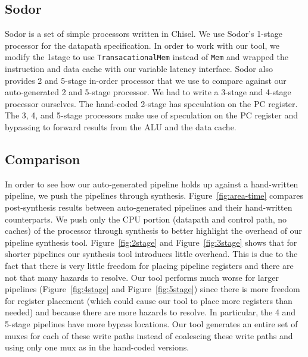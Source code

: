 \subsection{Sodor}
Sodor is a set of simple processors written in Chisel. We use Sodor's
1-stage processor for the datapath specification. In order to work
with our tool, we modify the 1stage to use {\tt TransacationalMem}
instead of {\tt Mem} and wrapped the instruction and data cache with
our variable latency interface. Sodor also provides 2 and 5-stage
in-order processor that we use to compare against our auto-generated 2
and 5-stage processor. We had to write a 3-stage and 4-stage processor
ourselves. The hand-coded 2-stage has speculation on the PC
register. The 3, 4, and 5-stage processors make use of speculation on
the PC register and bypassing to forward results from the ALU and the
data cache.

\subsection{Comparison}
In order to see how our auto-generated pipeline holds up against a
hand-written pipeline, we push the pipelines through
synthesis. Figure~\ref{fig:area-time} compares post-synthesis results
between auto-generated pipelines and their hand-written
counterparts. We push only the CPU portion (datapath and control path,
no caches) of the processor through synthesis to better highlight the
overhead of our pipeline synthesis tool. Figure~\ref{fig:2stage} and
Figure~\ref{fig:3stage} shows that for shorter pipelines our synthesis
tool introduces little overhead. This is due to the fact that there is
very little freedom for placing pipeline registers and there are not
that many hazards to resolve. Our tool performs much worse for larger
pipelines (Figure~\ref{fig:4stage} and Figure~\ref{fig:5stage}) since
there is more freedom for register placement (which could cause our
tool to place more registers than needed) and because there are more
hazards to resolve. In particular, the 4 and 5-stage pipelines have
more bypass locations. Our tool generates an entire set of muxes for
each of these write paths instead of coalescing these write paths and
using only one mux as in the hand-coded versions.
